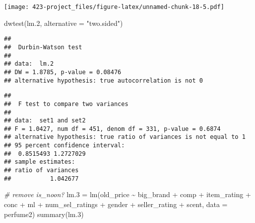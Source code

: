 \documentclass[
]{article}
\newenvironment{Shaded}{\begin{snugshade}}{\end{snugshade}}
\newcommand{\AttributeTok}[1]{\textcolor[rgb]{0.77,0.63,0.00}{#1}}
\newcommand{\CommentTok}[1]{\textcolor[rgb]{0.56,0.35,0.01}{\textit{#1}}}
\newcommand{\DecValTok}[1]{\textcolor[rgb]{0.00,0.00,0.81}{#1}}
\newcommand{\FloatTok}[1]{\textcolor[rgb]{0.00,0.00,0.81}{#1}}
\newcommand{\FunctionTok}[1]{\textcolor[rgb]{0.00,0.00,0.00}{#1}}
\newcommand{\NormalTok}[1]{#1}
\newcommand{\OtherTok}[1]{\textcolor[rgb]{0.56,0.35,0.01}{#1}}
\newcommand{\SpecialCharTok}[1]{\textcolor[rgb]{0.00,0.00,0.00}{#1}}
\newcommand{\StringTok}[1]{\textcolor[rgb]{0.31,0.60,0.02}{#1}}
\begin{document}
\texttt{[image: 423-project\_files/figure-latex/unnamed-chunk-18-5.pdf]}

\begin{Shaded}
\begin{Highlighting}[]
\FunctionTok{dwtest}\NormalTok{(lm}\FloatTok{.2}\NormalTok{, }\AttributeTok{alternative =} \StringTok{"two.sided"}\NormalTok{)}
\end{Highlighting}
\end{Shaded}

\begin{verbatim}
## 
##  Durbin-Watson test
## 
## data:  lm.2
## DW = 1.8785, p-value = 0.08476
## alternative hypothesis: true autocorrelation is not 0
\end{verbatim}

\begin{Shaded}
\end{Shaded}

\begin{verbatim}
## 
##  F test to compare two variances
## 
## data:  set1 and set2
## F = 1.0427, num df = 451, denom df = 331, p-value = 0.6874
## alternative hypothesis: true ratio of variances is not equal to 1
## 95 percent confidence interval:
##  0.8515493 1.2727029
## sample estimates:
## ratio of variances 
##           1.042677
\end{verbatim}

\begin{Shaded}
\begin{Highlighting}[]
\CommentTok{\# remove is\_noon?}
\NormalTok{lm}\FloatTok{.3} \OtherTok{=} \FunctionTok{lm}\NormalTok{(old\_price }\SpecialCharTok{\textasciitilde{}}\NormalTok{ big\_brand }\SpecialCharTok{+}\NormalTok{ comp }\SpecialCharTok{+}\NormalTok{ item\_rating }\SpecialCharTok{+}
\NormalTok{            conc }\SpecialCharTok{+}\NormalTok{ ml }\SpecialCharTok{+}\NormalTok{ num\_sel\_ratings }\SpecialCharTok{+}
\NormalTok{            gender }\SpecialCharTok{+}\NormalTok{ seller\_rating }\SpecialCharTok{+}\NormalTok{ scent, }\AttributeTok{data =}\NormalTok{ perfume2)}
\FunctionTok{summary}\NormalTok{(lm}\FloatTok{.3}\NormalTok{)}
\end{Highlighting}
\end{Shaded}
\end{document}
